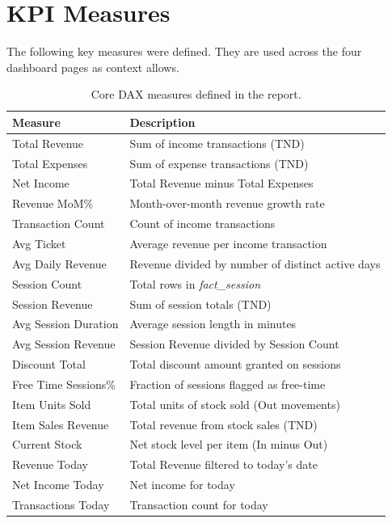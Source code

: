 \section{KPI Measures}

The following key measures were defined. They are used across the four dashboard
pages as context allows.

\begin{table}[H]
  \centering
  \caption{Core DAX measures defined in the report.}
  \begin{tabular}{ll}
    \toprule
    \textbf{Measure} & \textbf{Description} \\
    \midrule
    Total Revenue          & Sum of income transactions (TND) \\
    Total Expenses         & Sum of expense transactions (TND) \\
    Net Income             & Total Revenue minus Total Expenses \\
    Revenue MoM\%          & Month-over-month revenue growth rate \\
    Transaction Count      & Count of income transactions \\
    Avg Ticket             & Average revenue per income transaction \\
    Avg Daily Revenue      & Revenue divided by number of distinct active days \\
    \midrule
    Session Count          & Total rows in \textit{fact\_session} \\
    Session Revenue        & Sum of session totals (TND) \\
    Avg Session Duration   & Average session length in minutes \\
    Avg Session Revenue    & Session Revenue divided by Session Count \\
    Discount Total         & Total discount amount granted on sessions \\
    Free Time Sessions\%   & Fraction of sessions flagged as free-time \\
    \midrule
    Item Units Sold        & Total units of stock sold (Out movements) \\
    Item Sales Revenue     & Total revenue from stock sales (TND) \\
    Current Stock          & Net stock level per item (In minus Out) \\
    \midrule
    Revenue Today          & Total Revenue filtered to today's date \\
    Net Income Today       & Net income for today \\
    Transactions Today     & Transaction count for today \\
    \bottomrule
  \end{tabular}
\end{table}

